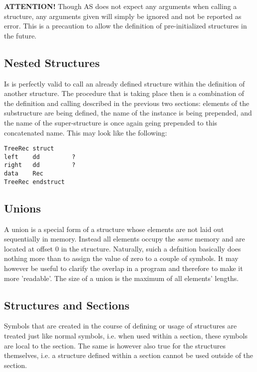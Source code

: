 \documentclass[12pt,twoside]{report}
\begin{document}
{\bf ATTENTION!} Though AS does not expect any arguments when calling a
structure, any arguments given will simply be ignored and not be reported
as error.  This is a precaution to allow the definition of pre-initialized
structures in the future.

\subsection{Nested Structures}

Is is perfectly valid to call an already defined structure within the
definition of another structure.  The procedure that is taking place then
is a combination of the definition and calling described in the previous
two sections: elements of the substructure are being defined, the name of
the instance is being prepended, and the name of the super-structure is
once again geing prepended to this concatenated name.  This may look like
the following:
\begin{verbatim}
TreeRec struct  
left    dd         ?
right   dd         ?
data    Rec
TreeRec endstruct
\end{verbatim}

\subsection{Unions}

A union is a special form of a structure whose elements are not laid out
sequentially in memory.  Instead all elements occupy the {\em same}
memory and are located at offset 0 in the structure.  Naturally, suich a
defnition basically does nothing more than to assign the value of zero to
a couple of symbols.  It may however be useful to clarify the overlap in a
program and therefore to make it more 'readable'.  The size of a union is
the maximum of all elements' lengths.

\subsection{Structures and Sections}

Symbols that are created in the course of defining or usage of structures
are treated just like normal symbols, i.e. when used within a section,
these symbols are local to the section.  The same is however also true for
the structures themselves, i.e. a structure defined within a section
cannot be used outside of the section.

\end{document}
